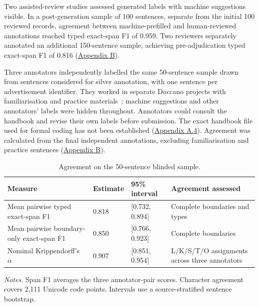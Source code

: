 \label{sec:annotation-quality}

Two assisted-review studies assessed generated labels with machine suggestions visible. In a post-generation sample of 100 sentences, separate from the initial 100 reviewed records, agreement between machine-prefilled and human-reviewed annotations reached typed exact-span F1 of 0.959. Two reviewers separately annotated an additional 150-sentence sample, achieving pre-adjudication typed exact-span F1 of 0.816 (\hyperref[app:b]{Appendix B}).

Three annotators independently labelled the same 50-sentence sample drawn from sentences considered for silver annotation, with one sentence per advertisement identifier. They worked in separate Doccano projects with familiarisation and practice materials~\citep{klie2024annotationquality}; machine suggestions and other annotators' labels were hidden throughout. Annotators could consult the handbook and revise their own labels before submission. The exact handbook file used for formal coding has not been established (\hyperref[sec:guide-version-history]{Appendix A.4}). Agreement was calculated from the final independent annotations, excluding familiarisation and practice sentences (\hyperref[sec:blinded-agreement-details]{Appendix B}).

\begin{table}[!htbp]
\caption{Agreement on the 50-sentence blinded sample.}
\label{tab:quality-main}
\centering\small
\setlength{\tabcolsep}{4pt}
\begin{tabularx}{\linewidth}{@{}P{.29\linewidth}P{.11\linewidth}P{.22\linewidth}L@{}}
\toprule
Measure & Estimate & 95\% interval & Agreement assessed \\
\midrule
Mean pairwise typed exact-span F1 & 0.818 & [0.732, 0.894] & Complete boundaries and types \\
Mean pairwise boundary-only exact-span F1 & 0.850 & [0.766, 0.923] & Complete boundaries \\
Nominal Krippendorff's $\alpha$ & 0.907 & [0.851, 0.954] & L/K/S/T/O assignments across three annotators \\
\bottomrule
\end{tabularx}
\par\smallskip
{\footnotesize\RaggedRight\textit{Notes.} Span F1 averages the three annotator-pair scores. Character agreement covers 2,111 Unicode code points. Intervals use a source-stratified sentence bootstrap.\par}
\end{table}

